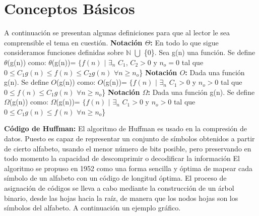 \documentclass[12pt,twoside]{article}
\begin{document}
\section{Conceptos B\'asicos}
A continuaci\'on se presentan algunas definiciones para que al lector le sea comprensible el tema en cuesti\'on.\newline
\newline
{\bf Notaci\'on $\Theta$:} 
En todo lo que sigue consideramos funciones definidas sobre $\mathbb{N}$
$\bigcup$  \{0\}. Sea g(n) una funci\'on. Se define $\theta$(g(n)) como: \newline $\theta$(g(n))= $\lbrace f(n)$ $\vert$ $\exists_{n}$ $C_{1}$, $C_{2}>0$ y $n_{o}=0$ tal que
$0\leq C_{1}g(n) \leq f(n )\leq C_{2}g(n)$ $\forall n\geq n_{o}$\} 
\newline \newline
{\bf Notaci\'on $O$:} Dada una funci\'on g(n). Se define $O$(g(n)) como: \newline $O$(g(n))= $\lbrace f(n)$ $\vert$ $\exists_{n}$ $C_{1}>0$ y $n_{o}>0$ tal que $0\leq f(n ) \leq C_{1}g(n)$ $\forall n\geq n_{o}$\} 
\newline \newline
{\bf Notaci\'on $\Omega$:} Dada una funci\'on g(n). Se define $\Omega$(g(n)) como: \newline $\Omega$(g(n))= $\lbrace f(n)$ $\vert$ $\exists_{n}$ $C_{1}>0$ y $n_{o}>0$ tal que $0\leq C_{1}g(n)\leq f(n ) $ $\forall n\geq n_{o}$\}
\newline \newline 



\textbf{\newline C\'odigo de Huffman:}
\newline
El algoritmo de Huffman es usado en la compresi\'on de datos. Puesto es capaz de representar un conjunto de s\'imbolos obtenidos a partir de cierto alfabeto, usando el menor n\'umero de bits posible, pero preservando en todo momento la capacidad de descomprimir o decodificar la informaci\'on \newline \newline
El algoritmo se propuso en 1952 como una forma sencilla y \'optima de mapear cada s\'imbolo de un alfabeto con un c\'odigo de longitud \'optima. El proceso de asignaci\'on de c\'odigos se lleva a cabo mediante la construcci\'on de un \'arbol binario, desde las hojas hacia la ra\'iz, de manera que los nodos hojas son los s\'imbolos del alfabeto. A continuaci\'on un ejemplo gr\'afico.
\end{document}
